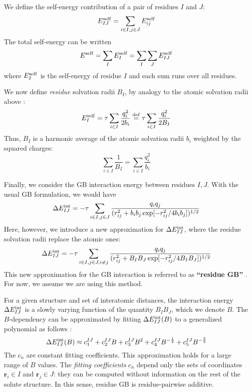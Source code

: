 \documentclass[12pt]{report}
\begin{document}
We define the self-energy contribution of a pair of residues $I$ and $J$:
\begin{equation}
E_{IJ}^{\rm self}=\sum_{i\in I, j\in J} E_{ij}^{\rm self}
\end{equation}
The total self-energy can be written 
\begin{equation}
E^{\rm self}=\sum_I E_I^{\rm self} = \sum_I \sum_J E_{IJ}^{\rm self}
\end{equation}
where $E_I^{\rm self}$ is the self-energy of residue $I$ and each sum runs over all residues.

We now define {\it residue} solvation radii $B_I$, by analogy to the atomic solvation radii above \cite{Archontis05b}:
\begin{equation}
E_I^{\rm self} = \tau \sum_{i \in I}\frac{q_i^2}{2b_i} \stackrel{\rm def}{=} \tau \sum_{i \in I}\frac{q_i^2}{2B_I}
\end{equation}
Thus, $B_I$ is a harmonic average of the atomic solvation radii $b_i$ weighted by the squared charges:
\begin{equation}
\sum_{i \in I} \frac{1}{B_I} = \sum_{i \in I} \frac{q_i^2}{b_i}
\end{equation}

Finally, we consider the GB interaction energy between residues $I, J$. With the usual GB formulation, we would have
\begin{equation}
\Delta E_{IJ}^{\rm int} = -\tau \sum_{i \in I, j \in J}\frac{q_i q_j}{(r_{ij}^2+b_ib_j\exp[-r_{ij}^2/4b_ib_j])^{1/2}}
\end{equation}
Here, however, we introduce a new approximation for $\Delta E_{IJ}^{\rm int}$, where the residue solvation radii replace the
atomic ones:
\begin{equation}
\Delta E_{IJ}^{\rm int} = -\tau \sum_{i \in I, j \in J, i\neq j}\frac{q_i q_j}{(r_{ij}^2+B_IB_J\exp[-r_{ij}^2/4B_IB_J])^{1/2}}
\end{equation}
This new approximation for the GB interaction is referred to as {\bf ``residue GB''} \cite{Archontis05b}. For now, we assume
we are using this method.

For a given structure and set of interatomic distances, the interaction energy $\Delta E_{IJ}^{\rm int}$ is a slowly varying
function of the quantity $B_I B_J$, which we denote $B$. The $B$-dependency can be approximated by fitting
$\Delta E_{IJ}^{\rm int}(B)$ to a generalized polynomial as follows \cite{Archontis05b}:
\begin{equation}
\Delta E_{IJ}^{\rm int}(B) \approx c_1^{IJ} + c_2^{IJ} B + c_3^{IJ} B^2 + c_4^{IJ} B^{-\frac{1}{2}} + c_5^{IJ} B^{-\frac{3}{2}}
\end{equation}
The $c_n$ are constant fitting coefficients. This approximation holds for a large range of $B$ values. The {\it fitting
coefficients} $c_n$ depend only the sets of coordinates $\textbf{r}_i \in I$ and $\textbf{r}_j \in J$: they can be computed
without information on the rest of the solute structure. In this sense, residue GB is residue-pairwise additive.
\end{document}
